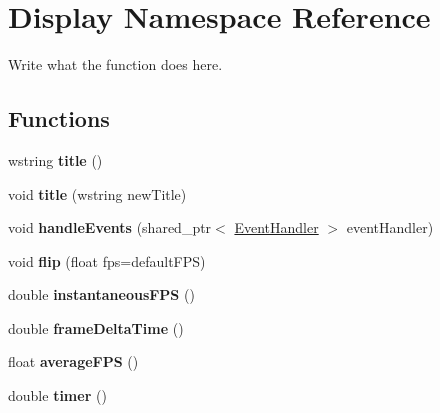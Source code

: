 \hypertarget{namespaceDisplay}{\section{Display Namespace Reference}
\label{namespaceDisplay}
}


Write what the function does here.  


\subsection*{Functions}
\begin{DoxyCompactItemize}
\item 
\hypertarget{namespaceDisplay_ae4865b9a54fa46583ee1fa484a7a988a}{wstring {\bfseries title} ()}\label{namespaceDisplay_ae4865b9a54fa46583ee1fa484a7a988a}

\item 
\hypertarget{namespaceDisplay_ac19ff09a65e938395316d857a8df0b53}{void {\bfseries title} (wstring new\+Title)}\label{namespaceDisplay_ac19ff09a65e938395316d857a8df0b53}

\item 
\hypertarget{namespaceDisplay_a770f70cafdffb882b86d53167b83760e}{void {\bfseries handle\+Events} (shared\+\_\+ptr$<$ \hyperlink{structEventHandler}{Event\+Handler} $>$ event\+Handler)}\label{namespaceDisplay_a770f70cafdffb882b86d53167b83760e}

\item 
\hypertarget{namespaceDisplay_af05e96cb40871e76809f0d52402e424d}{void {\bfseries flip} (float fps=default\+F\+P\+S)}\label{namespaceDisplay_af05e96cb40871e76809f0d52402e424d}

\item 
\hypertarget{namespaceDisplay_a8bd51b6484deb659129c817d02d6aba2}{double {\bfseries instantaneous\+F\+P\+S} ()}\label{namespaceDisplay_a8bd51b6484deb659129c817d02d6aba2}

\item 
\hypertarget{namespaceDisplay_a9b5a7c808d895181ccf28bee313d5e16}{double {\bfseries frame\+Delta\+Time} ()}\label{namespaceDisplay_a9b5a7c808d895181ccf28bee313d5e16}

\item 
\hypertarget{namespaceDisplay_a42637144f68c57f8a3fc9f702eab8c1c}{float {\bfseries average\+F\+P\+S} ()}\label{namespaceDisplay_a42637144f68c57f8a3fc9f702eab8c1c}

\item 
\hypertarget{namespaceDisplay_a967b33e8444b98707dd315dc11bd262f}{double {\bfseries timer} ()}\label{namespaceDisplay_a967b33e8444b98707dd315dc11bd262f}


\end{DoxyCompactItemize}
